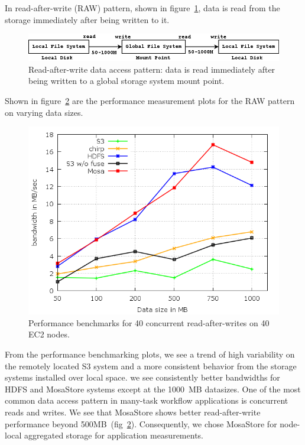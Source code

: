 \documentclass{sig-alternate}
\begin{document}
In read-after-write (RAW)
pattern, shown in figure~\ref{fig:raw}, data is read from the storage
immediately after being written to it. 
%
\begin{figure}[htb]
\begin{center}
\includegraphics[width=13cm]{figures/raw.png}
\caption{Read-after-write data access pattern: data is read immediately after being written to a global storage system mount point.
\label{fig:raw}
}
\end{center}
\end{figure}
%
Shown in figure~\ref{fig:raw_perf} are the performance measurement plots for the RAW pattern on varying data sizes.
%
\begin{figure}[htb]
\begin{center}
\includegraphics[width=\linewidth]{plots/RAW-bw.png}
\caption{Performance benchmarks for 40 concurrent read-after-writes on 40 EC2 nodes.
\label{fig:raw_perf}
}
\end{center}
\end{figure}
%
From the performance benchmarking plots, we see a trend of high variability on
the remotely located S3 system and a more consistent behavior from the storage
systems installed over local space. we see  consistently better bandwidths for
HDFS and MosaStore systems except at the 1000~MB datasizes. One of the most
common data access pattern in many-task workflow applications is concurrent
reads and writes. We see that MosaStore shows better read-after-write
performance beyond 500MB~(fig~\ref{fig:raw_perf}). Consequently, we chose
MosaStore for node-local aggregated storage for application measurements.
\end{document}
